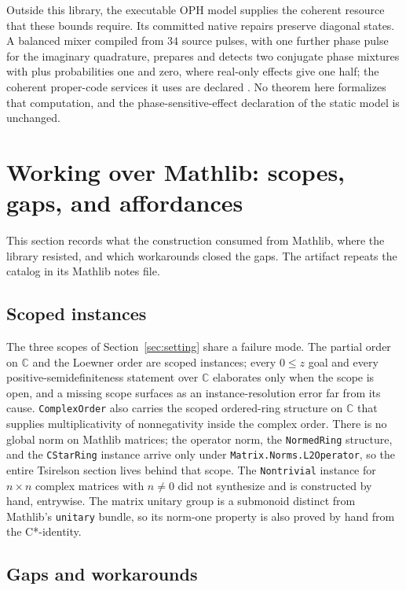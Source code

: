 \documentclass[11pt]{article}
\renewcommand{\_}{\textunderscore\allowbreak}
\theoremstyle{remark}
\newcommand{\C}{\mathbb C}
\begin{document}
Outside this library, the executable OPH model supplies the coherent resource
that these bounds require. Its committed native repairs preserve diagonal
states. A balanced mixer compiled from $34$ source pulses, with one further
phase pulse for the imaginary quadrature, prepares and detects two conjugate
phase mixtures with plus probabilities one and zero, where real-only effects
give one half; the coherent proper-code services it uses are declared
\cite{ophinterface}. No theorem here formalizes that computation, and the
phase-sensitive-effect declaration of the static model is unchanged.

\section{Working over Mathlib: scopes, gaps, and affordances}
\label{sec:mathlib}

This section records what the construction consumed from Mathlib, where the
library resisted, and which workarounds closed the gaps. The artifact
repeats the catalog in its Mathlib notes file.

\subsection{Scoped instances}

The three scopes of Section~\ref{sec:setting} share a failure mode. The
partial order on $\C$ and the Loewner order are scoped instances; every
$0\le z$ goal and every positive-semidefiniteness statement over $\C$
elaborates only when the scope is open, and a missing scope surfaces as an
instance-resolution error far from its cause. \texttt{ComplexOrder} also
carries the scoped ordered-ring structure on $\C$ that supplies
multiplicativity of nonnegativity inside the complex order. There is no
global norm on Mathlib matrices; the operator norm, the
\texttt{NormedRing} structure, and the \texttt{CStarRing} instance arrive
only under \texttt{Matrix.Norms.L2Operator}, so the entire Tsirelson section
lives behind that scope. The \texttt{Nontrivial} instance for
$n\times n$ complex matrices with $n\ne0$ did not synthesize and is
constructed by hand, entrywise. The matrix unitary group is a submonoid
distinct from Mathlib's \texttt{unitary} bundle, so its norm-one property is
also proved by hand from the C*-identity.

\subsection{Gaps and workarounds}
\end{document}
